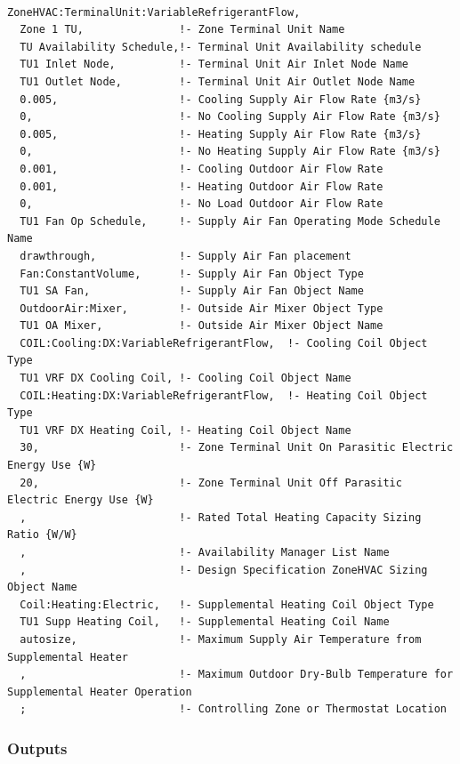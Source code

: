\begin{lstlisting}

ZoneHVAC:TerminalUnit:VariableRefrigerantFlow,
  Zone 1 TU,               !- Zone Terminal Unit Name
  TU Availability Schedule,!- Terminal Unit Availability schedule
  TU1 Inlet Node,          !- Terminal Unit Air Inlet Node Name
  TU1 Outlet Node,         !- Terminal Unit Air Outlet Node Name
  0.005,                   !- Cooling Supply Air Flow Rate {m3/s}
  0,                       !- No Cooling Supply Air Flow Rate {m3/s}
  0.005,                   !- Heating Supply Air Flow Rate {m3/s}
  0,                       !- No Heating Supply Air Flow Rate {m3/s}
  0.001,                   !- Cooling Outdoor Air Flow Rate
  0.001,                   !- Heating Outdoor Air Flow Rate
  0,                       !- No Load Outdoor Air Flow Rate
  TU1 Fan Op Schedule,     !- Supply Air Fan Operating Mode Schedule Name
  drawthrough,             !- Supply Air Fan placement
  Fan:ConstantVolume,      !- Supply Air Fan Object Type
  TU1 SA Fan,              !- Supply Air Fan Object Name
  OutdoorAir:Mixer,        !- Outside Air Mixer Object Type
  TU1 OA Mixer,            !- Outside Air Mixer Object Name
  COIL:Cooling:DX:VariableRefrigerantFlow,  !- Cooling Coil Object Type
  TU1 VRF DX Cooling Coil, !- Cooling Coil Object Name
  COIL:Heating:DX:VariableRefrigerantFlow,  !- Heating Coil Object Type
  TU1 VRF DX Heating Coil, !- Heating Coil Object Name
  30,                      !- Zone Terminal Unit On Parasitic Electric Energy Use {W}
  20,                      !- Zone Terminal Unit Off Parasitic Electric Energy Use {W}
  ,                        !- Rated Total Heating Capacity Sizing Ratio {W/W}
  ,                        !- Availability Manager List Name
  ,                        !- Design Specification ZoneHVAC Sizing Object Name
  Coil:Heating:Electric,   !- Supplemental Heating Coil Object Type
  TU1 Supp Heating Coil,   !- Supplemental Heating Coil Name
  autosize,                !- Maximum Supply Air Temperature from Supplemental Heater
  ,                        !- Maximum Outdoor Dry-Bulb Temperature for Supplemental Heater Operation
  ;                        !- Controlling Zone or Thermostat Location
\end{lstlisting}

\subsubsection{Outputs}\label{outputs-12-006}


